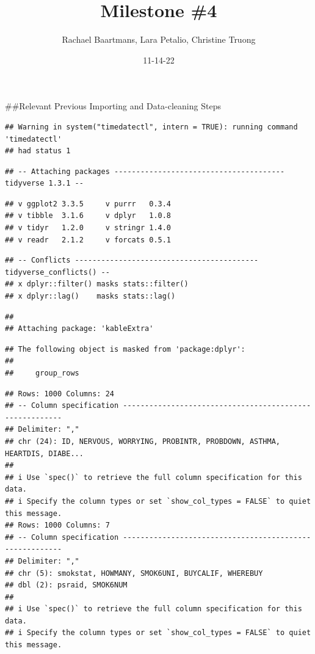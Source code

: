 \documentclass[
]{article}
\title{Milestone \#4}
\author{Rachael Baartmans, Lara Petalio, Christine Truong}
\date{11-14-22}
\begin{document}
\maketitle

\#\#Relevant Previous Importing and Data-cleaning Steps

\begin{verbatim}
## Warning in system("timedatectl", intern = TRUE): running command 'timedatectl'
## had status 1
\end{verbatim}

\begin{verbatim}
## -- Attaching packages --------------------------------------- tidyverse 1.3.1 --
\end{verbatim}

\begin{verbatim}
## v ggplot2 3.3.5     v purrr   0.3.4
## v tibble  3.1.6     v dplyr   1.0.8
## v tidyr   1.2.0     v stringr 1.4.0
## v readr   2.1.2     v forcats 0.5.1
\end{verbatim}

\begin{verbatim}
## -- Conflicts ------------------------------------------ tidyverse_conflicts() --
## x dplyr::filter() masks stats::filter()
## x dplyr::lag()    masks stats::lag()
\end{verbatim}

\begin{verbatim}
## 
## Attaching package: 'kableExtra'
\end{verbatim}

\begin{verbatim}
## The following object is masked from 'package:dplyr':
## 
##     group_rows
\end{verbatim}

\begin{verbatim}
## Rows: 1000 Columns: 24
## -- Column specification --------------------------------------------------------
## Delimiter: ","
## chr (24): ID, NERVOUS, WORRYING, PROBINTR, PROBDOWN, ASTHMA, HEARTDIS, DIABE...
## 
## i Use `spec()` to retrieve the full column specification for this data.
## i Specify the column types or set `show_col_types = FALSE` to quiet this message.
## Rows: 1000 Columns: 7
## -- Column specification --------------------------------------------------------
## Delimiter: ","
## chr (5): smokstat, HOWMANY, SMOK6UNI, BUYCALIF, WHEREBUY
## dbl (2): psraid, SMOK6NUM
## 
## i Use `spec()` to retrieve the full column specification for this data.
## i Specify the column types or set `show_col_types = FALSE` to quiet this message.
\end{verbatim}
\end{document}
